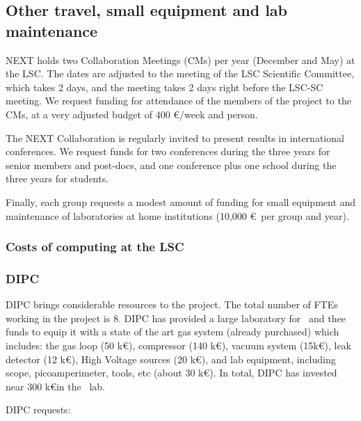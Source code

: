 \subsection{Other travel, small equipment and lab maintenance}
\label{sec:othercosts}

NEXT holds two Collaboration Meetings (CMs) per year (December and May) at the LSC. The dates are adjusted to the meeting of the LSC Scientific Committee, which takes 2 days, and the meeting takes 2 days right before the LSC-SC meeting. We request funding for attendance of the members of the project to the CMs, at a very adjusted budget of 400 \euro/week and person.

The NEXT Collaboration is regularly invited to present results in international conferences. We request funds for two conferences during the three years for senior members and post-docs, and one conference plus one school during the three years for students.

Finally, each group requests a modest amount of funding for small equipment and maintenance of laboratories at home institutions (10,000 \euro\ per group and year). 

\subsubsection{Costs of computing at the LSC}

\subsubsection{DIPC}

DIPC brings considerable resources to the project. The total number of FTEs working in the project is 8. DIPC has provided a large laboratory for \HDEMO\ and thee funds to equip it with a state of the art gas system (already purchased) which includes: the gas loop (50 k\euro), compressor (140 k€),
vacuum system (15k\euro), leak detector (12 k\euro), High Voltage sources (20 k\euro), and lab equipment, including scope, picoamperimeter, tools, etc 
(about 30 k\euro). In total, DIPC has invested near 300 k\euro in the \HDEMO\ lab. 
 
DIPC requests:


